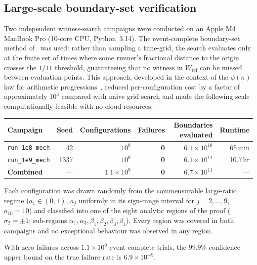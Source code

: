 \documentclass[12pt,a4paper]{amsart}
\theoremstyle{definition}
\theoremstyle{remark}
\newcommand{\Wref}{W_{\mathrm{ref}}}
\begin{document}
\subsection*{Large-scale boundary-set verification}

Two independent witness-search campaigns were conducted on an Apple M4 MacBook Pro
(10-core CPU, Python~3.14).  The event-complete boundary-set method of~\cite{Pal26}
was used: rather than sampling a time-grid, the search evaluates only at the finite
set of times where some runner's fractional distance to the origin crosses the
$1/11$ threshold, guaranteeing that no witness in $\Wref$ can be missed between
evaluation points.  This approach, developed in the context of the $\phi(n)$ law for
arithmetic progressions~\cite{Pal26}, reduced per-configuration cost by a factor of
approximately $10^{3}$ compared with naive grid search and made the following scale
computationally feasible with no cloud resources.

\begin{center}
\begin{tabular}{lrrrrr}
\hline
Campaign & Seed & Configurations & Failures & Boundaries evaluated & Runtime \\
\hline
\texttt{run\_1e8\_mech} & 42   & $10^{8}$ & \textbf{0} & $6.1\times10^{10}$ & 65\,min \\
\texttt{run\_1e9\_mech} & 1337 & $10^{9}$ & \textbf{0} & $6.1\times10^{11}$ & 10.7\,hr \\
\hline
\textbf{Combined}       & ---  & $1.1\times10^{9}$ & \textbf{0} & $6.7\times10^{11}$ & --- \\
\hline
\end{tabular}
\end{center}

Each configuration was drawn randomly from the commensurable large-ratio regime
($a_1\in(0,1)$, $a_j$ uniformly in its sign-range interval for $j=2,\ldots,9$,
$a_{10}=10$) and classified into one of the eight analytic regions of the proof
($\sigma_2=\pm1$; sub-regions $\alpha_1,\alpha_3,\beta_1,\beta_2,\beta_3,\beta_4$).
Every region was covered in both campaigns and no exceptional behaviour was observed
in any region.

With zero failures across $1.1\times10^{9}$ event-complete trials, the 99.9\%
confidence upper bound on the true failure rate is $6.9\times10^{-9}$.
\end{document}

